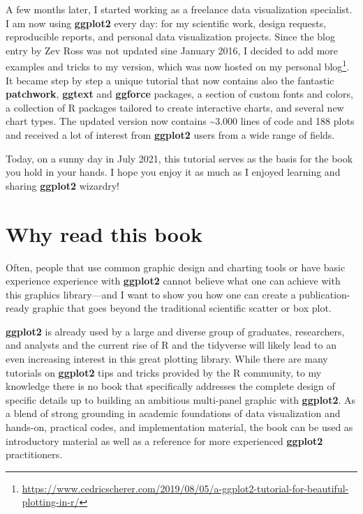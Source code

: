 \documentclass[
]{krantz}
\renewcommand{\href}[2]{#2\footnote{\url{#1}}}
\begin{document}
A few months later, I started working as a freelance data visualization specialist. I am now using \textbf{ggplot2} every day: for my scientific work, design requests, reproducible reports, and personal data visualization projects. Since the blog entry by Zev Ross was not updated sine January 2016, I decided to add more examples and tricks to my version, which was now hosted on my \href{https://www.cedricscherer.com/2019/08/05/a-ggplot2-tutorial-for-beautiful-plotting-in-r/}{personal blog}. It became step by step a unique tutorial that now contains also the fantastic \textbf{patchwork}, \textbf{ggtext} and \textbf{ggforce} packages, a section of custom fonts and colors, a collection of R packages tailored to create interactive charts, and several new chart types. The updated version now contains \textasciitilde3.000 lines of code and 188 plots and received a lot of interest from \textbf{ggplot2} users from a wide range of fields.

Today, on a sunny day in July 2021, this tutorial serves as the basis for the book you hold in your hands. I hope you enjoy it as much as I enjoyed learning and sharing \textbf{ggplot2} wizardry!

\hypertarget{why-read-this-book}{%
\section*{Why read this book}\label{why-read-this-book}}


Often, people that use common graphic design and charting tools or have basic experience experience with \textbf{ggplot2} cannot believe what one can achieve with this graphics library---and I want to show you how one can create a publication-ready graphic that goes beyond the traditional scientific scatter or box plot.

\textbf{ggplot2} is already used by a large and diverse group of graduates, researchers, and analysts and the current rise of R and the tidyverse will likely lead to an even increasing interest in this great plotting library. While there are many tutorials on \textbf{ggplot2} tips and tricks provided by the R community, to my knowledge there is no book that specifically addresses the complete design of specific details up to building an ambitious multi-panel graphic with \textbf{ggplot2}. As a blend of strong grounding in academic foundations of data visualization and hands-on, practical codes, and implementation material, the book can be used as introductory material as well as a reference for more experienced \textbf{ggplot2} practitioners.
\end{document}

